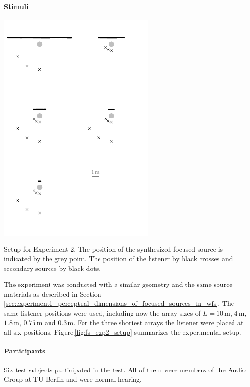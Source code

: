 \paragraph{Stimuli}
%
\begin{marginfigure}[-8cm]
    \includegraphics{fig5_16/fig5_16}
    \caption{Setup for Experiment 2. The position of the synthesized focused
    source is indicated by the grey point. The position of the listener by black
    crosses and secondary sources by black dots.
        }
    \label{fig:fs_exp2_setup}
\end{marginfigure}
%
The experiment was conducted with a similar geometry and the same source materials
as described in
Section\,\ref{sec:experiment1_perceptual_dimensions_of_focused_sources_in_wfs}.
The same listener positions were used, including now the array sizes of
$L = 10$\,m, $4$\,m, $1.8$\,m, $0.75$\,m and $0.3$\,m.
For the three shortest arrays the listener were placed at all six positions.
Figure\,\ref{fig:fs_exp2_setup} summarizes the experimental
setup.


\paragraph{Participants}
Six test subjects participated in the test. All of them were members of
the Audio Group at {\small TU} Berlin and were normal hearing.


